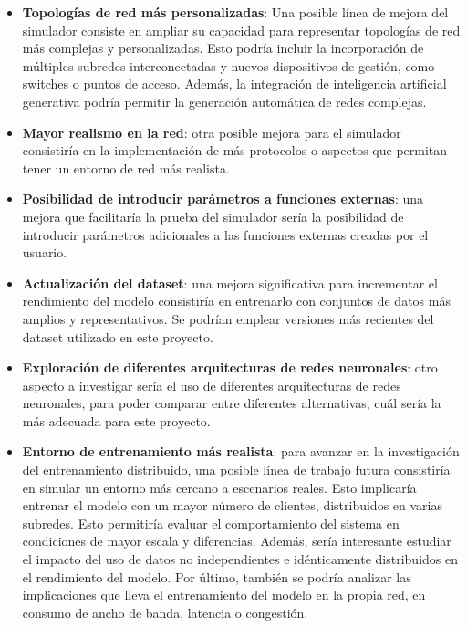 \begin{itemize}
    \item \textbf{Topologías de red más personalizadas}: Una posible línea de mejora del simulador consiste en ampliar su capacidad para representar topologías de red más complejas y personalizadas. Esto podría incluir la incorporación de múltiples subredes interconectadas y nuevos dispositivos de gestión, como switches o puntos de acceso. Además, la integración de inteligencia artificial generativa podría permitir la generación automática de redes complejas.
    \item \textbf{Mayor realismo en la red}: otra posible mejora para el simulador consistiría en la implementación de más protocolos o aspectos que permitan tener un entorno de red más realista.
    \item \textbf{Posibilidad de introducir parámetros a funciones externas}: una mejora que facilitaría la prueba del simulador sería la posibilidad de introducir parámetros adicionales a las funciones externas creadas por el usuario.
    \item \textbf{Actualización del dataset}: una mejora significativa para incrementar el rendimiento del modelo consistiría en entrenarlo con conjuntos de datos más amplios y representativos. Se podrían emplear versiones más recientes del dataset utilizado en este proyecto.
    \item \textbf{Exploración de diferentes arquitecturas de redes neuronales}: otro aspecto a investigar sería el uso de diferentes arquitecturas de redes neuronales, para poder comparar entre diferentes alternativas, cuál sería la más adecuada para este proyecto.
    \item \textbf{Entorno de entrenamiento más realista}: para avanzar en la investigación del entrenamiento distribuido, una posible línea de trabajo futura consistiría en simular un entorno más cercano a escenarios reales. Esto implicaría entrenar el modelo con un mayor número de clientes, distribuidos en varias subredes. Esto permitiría evaluar el comportamiento del sistema en condiciones de mayor escala y diferencias. Además, sería interesante estudiar el impacto del uso de datos no independientes e idénticamente distribuidos en el rendimiento del modelo. Por último, también se podría analizar las implicaciones que lleva el entrenamiento del modelo en la propia red, en consumo de ancho de banda, latencia o congestión.
\end{itemize}